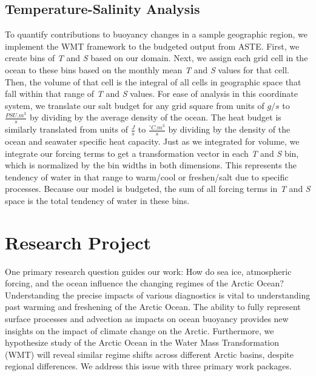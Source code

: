 \documentclass[a4paper,12pt]{article}
\begin{document}
    \subsection{Temperature-Salinity Analysis}
    
    To quantify contributions to buoyancy changes in a sample geographic region, we implement the WMT framework \cite{Walin1982,Groeskamp2014} to the budgeted output from ASTE. First, we create bins of \emph{T} and \emph{S} based on our domain. Next, we assign each grid cell in the ocean to these bins based on the monthly mean \emph{T} and \emph{S} values for that cell. Then, the volume of that cell is the integral of all cells in geographic space that fall within that range of \emph{T} and \emph{S} values. For ease of analysis in this coordinate system, we translate our salt budget for any grid square from units of $g/s$ to $\frac{PSU.m^3}{s}$ by dividing by the average density of the ocean. The heat budget is similarly translated from units of $\frac{J}{s}$ to $\frac{^\circ C.m^3}{s}$ by dividing by the density of the ocean and seawater specific heat capacity. Just as we integrated for volume, we integrate our forcing terms to get a transformation vector in each \emph{T} and \emph{S} bin, which is normalized by the bin widths in both dimensions. This represents the tendency of water in that range to warm/cool or freshen/salt due to specific processes. Because our model is budgeted, the sum of all forcing terms in \emph{T} and \emph{S} space is the total tendency of water in these bins.

    
    \section{Research Project}
    One primary research question guides our work: How do sea ice, atmospheric forcing, and the ocean influence the changing regimes of the Arctic Ocean? Understanding the precise impacts of various diagnostics is vital to understanding past warming and freshening of the Arctic Ocean. The ability to fully represent surface processes and advection as impacts on ocean buoyancy provides new insights on the impact of climate change on the Arctic. Furthermore, we hypothesize study of the Arctic Ocean in the Water Mass Transformation (WMT) will reveal similar regime shifts across different Arctic basins, despite regional differences. We address this issue with three primary work packages.
\end{document}
